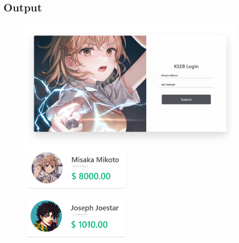 \documentclass{article}
\begin{document}
\subsection{Output}
\begin{figure}[h!]
	\centering
	\includegraphics[width=1\textwidth]{./Assets/p2301.png}
	\includegraphics[width=0.5\textwidth]{./Assets/p2302.png}
	\includegraphics[width=0.5\textwidth]{./Assets/p2303.png}
\end{figure}
\newpage
\end{document}
